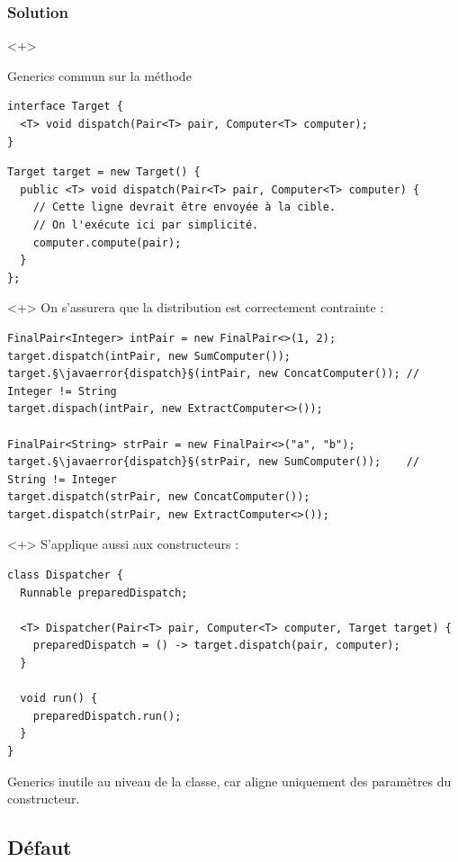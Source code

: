 \documentclass[draft]{beamer}
\makeatletter
\def\uwave{\bgroup\markoverwith{\lower4\p@\hbox{\sixly \textcolor{errorcolor}{\char58}}}\ULon}
\newcommand{\javaerror}[1]{%
  \uwave{#1}%
}
\makeatother
\begin{document}
\begin{frame}[fragile]
\frametitle{Solution}
\begin{onlyenv}<+>
\begin{exampleblock}{Generics commun sur la méthode}
\begin{lstlisting}[numbers=none]
interface Target {
  <T> void dispatch(Pair<T> pair, Computer<T> computer);
}
\end{lstlisting}
\end{exampleblock}
\begin{lstlisting}
Target target = new Target() {
  public <T> void dispatch(Pair<T> pair, Computer<T> computer) {
    // Cette ligne devrait être envoyée à la cible.
    // On l'exécute ici par simplicité.
    computer.compute(pair);
  }
};
\end{lstlisting}
\end{onlyenv}
\begin{onlyenv}<+>
On s'assurera que la distribution est correctement contrainte :
\begin{lstlisting}
FinalPair<Integer> intPair = new FinalPair<>(1, 2);
target.dispatch(intPair, new SumComputer());
target.§\javaerror{dispatch}§(intPair, new ConcatComputer()); // Integer != String
target.dispach(intPair, new ExtractComputer<>());

FinalPair<String> strPair = new FinalPair<>("a", "b");
target.§\javaerror{dispatch}§(strPair, new SumComputer());    // String != Integer
target.dispatch(strPair, new ConcatComputer());
target.dispatch(strPair, new ExtractComputer<>());
\end{lstlisting}
\end{onlyenv}
\begin{onlyenv}<+>
S'applique aussi aux constructeurs :
\begin{lstlisting}
class Dispatcher {
  Runnable preparedDispatch;
  
  <T> Dispatcher(Pair<T> pair, Computer<T> computer, Target target) {
    preparedDispatch = () -> target.dispatch(pair, computer);
  }
  
  void run() {
    preparedDispatch.run();
  }
}
\end{lstlisting}
Generics inutile au niveau de la classe, car aligne uniquement des paramètres du constructeur.
\end{onlyenv}
\end{frame}

\subsection{Défaut}
\end{document}

